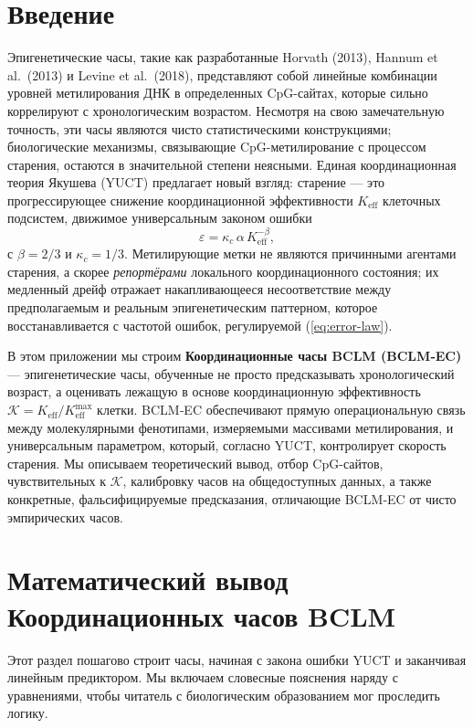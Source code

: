 \documentclass[12pt,a4paper]{article}
\newcommand{\REL}{\mathcal{K}}          %
\begin{document}
	\tableofcontents
	\newpage
	
	\section{Введение}
	\label{sec:intro}
	Эпигенетические часы, такие как разработанные Horvath (2013), Hannum et al.\ (2013) и Levine et al.\ (2018), представляют собой линейные комбинации уровней метилирования ДНК в определенных CpG-сайтах, которые сильно коррелируют с хронологическим возрастом.
	Несмотря на свою замечательную точность, эти часы являются чисто статистическими конструкциями; биологические механизмы, связывающие CpG-метилирование с процессом старения, остаются в значительной степени неясными.
	Единая координационная теория Якушева (YUCT) предлагает новый взгляд: старение — это прогрессирующее снижение координационной эффективности \(K_{\mathrm{eff}}\) клеточных подсистем, движимое универсальным законом ошибки
	\begin{equation}
		\varepsilon = \kappa_c \, \alpha \, K_{\mathrm{eff}}^{-\beta},
		\label{eq:error-law}
	\end{equation}
	с \(\beta = 2/3\) и \(\kappa_c = 1/3\).
	Метилирующие метки не являются причинными агентами старения, а скорее \emph{репортёрами} локального координационного состояния; их медленный дрейф отражает накапливающееся несоответствие между предполагаемым и реальным эпигенетическим паттерном, которое восстанавливается с частотой ошибок, регулируемой (\ref{eq:error-law}).
	
	В этом приложении мы строим \textbf{Координационные часы BCLM (BCLM‑EC)} — эпигенетические часы, обученные не просто предсказывать хронологический возраст, а оценивать лежащую в основе координационную эффективность \(\REL = K_{\mathrm{eff}}/K_{\mathrm{eff}}^{\max}\) клетки.
	BCLM‑EC обеспечивают прямую операциональную связь между молекулярными фенотипами, измеряемыми массивами метилирования, и универсальным параметром, который, согласно YUCT, контролирует скорость старения.
	Мы описываем теоретический вывод, отбор CpG-сайтов, чувствительных к \(\REL\), калибровку часов на общедоступных данных, а также конкретные, фальсифицируемые предсказания, отличающие BCLM‑EC от чисто эмпирических часов.
	
	\section{Математический вывод Координационных часов BCLM}
	\label{sec:math}
	Этот раздел пошагово строит часы, начиная с закона ошибки YUCT и заканчивая линейным предиктором. Мы включаем словесные пояснения наряду с уравнениями, чтобы читатель с биологическим образованием мог проследить логику.
	
\end{document}
